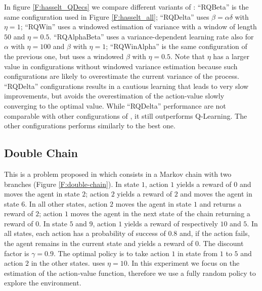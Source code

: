 \documentclass[conference]{IEEEtran}
\begin{document}
In figure \ref{F:hasselt_QDecs} we compare different variants of \alg: ``RQBeta'' is the same configuration used in Figure \ref{F:hasselt_all}; ``RQDelta'' uses $\beta = \alpha \delta$ with $\eta = 1$; ``RQWin'' uses a windowed estimation of variance with a window of length $50$ and $\eta = 0.5$. ``RQAlphaBeta'' uses a variance-dependent learning rate also for $\alpha$ with $\eta = 100$ and $\beta$ with $\eta = 1$; ``RQWinAlpha'' is the same configuration of the previous one, but uses a windowed $\beta$ with $\eta = 0.5$. Note that $\eta$ has a larger value in configurations without windowed variance estimation because such configurations are likely to overestimate the current variance of the process. ``RQDelta'' configurations results in a cautious learning that leads to very slow improvements, but avoids the overestimation of the action-value slowly converging to the optimal value. While ``RQDelta'' performance are not comparable with other configurations of \alg, it still outperforms Q-Learning. The other configurations performs similarly to the best one.

\subsection{Double Chain}
This is a problem proposed in \cite{Peters2010RelativeEP} which consists in a Markov chain with two branches (Figure \ref{F:double-chain}). In state $1$, action $1$ yields a reward of $0$ and moves the agent in state $2$; action $2$ yields a reward of $2$ and moves the agent in state $6$. In all other states, action $2$ moves the agent in state $1$ and returns a reward of $2$; action $1$ moves the agent in the next state of the chain returning a reward of $0$. In state $5$ and $9$, action $1$ yields a reward of respectively $10$ and $5$. In all states, each action has a probability of success of $0.8$ and, if the action fails, the agent remains in the current state and yields a reward of $0$. The discount factor is $\gamma = 0.9$. The optimal policy is to take action $1$ in state from $1$ to $5$ and action $2$ in the other states. \alg uses $\eta = 10$. In this experiment we focus on the estimation of the action-value function, therefore we use a fully random policy to explore the environment.
\end{document}
